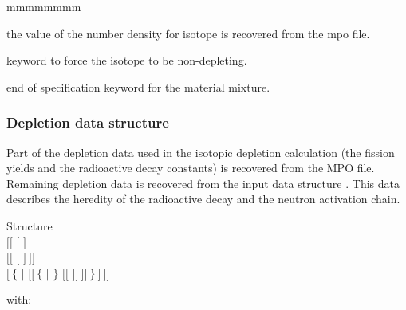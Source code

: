 \begin{ListeDeDescription}{mmmmmmmm}
\item[\moc{*}] the value of the number density for isotope  is recovered from the {\sc mpo} file.

\item[\moc{NOEV}] keyword to force the isotope  to be non-depleting.

\item[\moc{ENDMIX}] end of specification keyword for the material mixture.

\end{ListeDeDescription}

\subsubsection{Depletion data structure}\label{sect:MCRdescdepld}

Part of the depletion data used in the isotopic depletion calculation (the fission yields and the
radioactive decay constants) is recovered from the MPO file. Remaining depletion data is
recovered from the input data structure . This data describes the heredity of the radioactive decay
and the neutron activation chain.

\begin{DataStructure}{Structure }
 \\
\hskip 0.3cm $[[$  $[$  $]$ \\
\hskip 0.6cm $[[$  $[$  $]~]]$ \\
\hskip 0.6cm $[~\{$  $|$  $[[~\{$  $|$  $\}$
$[[$   $]]~]]~\}~]~]]$\\
\end{DataStructure}

\noindent
with:


